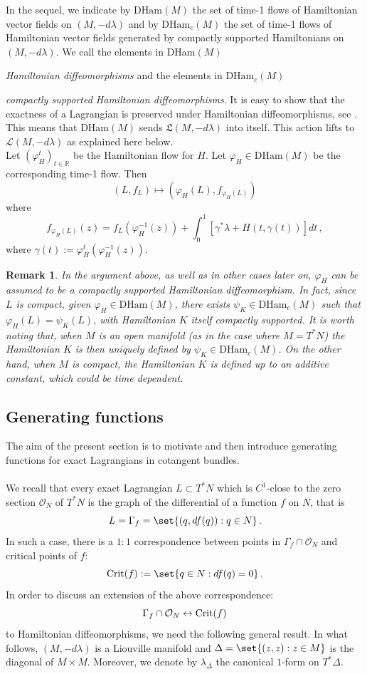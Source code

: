 \documentclass{article}
\newcommand{\1}{\mathbbm{1}}
\newtheorem{rem}[thm]{Remark}
\theoremstyle{remark}
\begin{document}
\noindent In the sequel, we indicate by $\mathrm{DHam}(M)$ the set of time-1 flows of Hamiltonian vector fields on $(M, -d\lambda)$ and by $\mathrm{DHam}_c(M)$ the set of time-1 flows of Hamiltonian vector fields generated by compactly supported Hamiltonians on $(M, -d\lambda)$. We call the elements in $\mathrm{DHam}(M)$ {\textit{Hamiltonian diffeomorphisms} and the elements in $\mathrm{DHam}_c(M)$  {\textit{compactly supported Hamiltonian diffeomorphisms}. 
It is easy to show that the exactness of a Lagrangian is preserved under Hamiltonian diffeomorphisms, see \cite[Corollary 9.3.6]{mcDSal16}. This means that $\mathrm{DHam}(M)$ sends $\mathfrak{L}(M, -d\lambda)$ into itself. This action lifts to $\mathscr{L}(M, -d\lambda)$ as explained here below. \\
Let $(\varphi^t_H)_{t \in \mathbb{R}}$ be the Hamiltonian flow for $H$. Let $\varphi_H \in \mathrm{DHam}(M)$ be the corresponding time-1 flow. Then
$$(L,f_L) \mapsto(\varphi_H(L), f_{\varphi_H(L)})$$
where
$$f_{\varphi_H(L)}(z) = f_L(\varphi_H^{-1}(z)) + \int^1_0[\gamma^*\lambda + H(t,\gamma(t))]dt\, ,$$
where $\gamma(t) := \varphi^t_H(\varphi_H^{-1}(z))$.
\begin{rem} \label{nota supp com} {\textnormal{In the argument above, as well as in other cases later on, $\varphi_H$ can be assumed to be a compactly supported Hamiltonian diffeomorphism. In fact, since $L$ is compact, given $\varphi_H \in \mathrm{DHam}(M)$, there exists $\psi_K \in \mathrm{DHam}_c(M)$ such that $\varphi_H(L) = \psi_K(L)$, with Hamiltonian $K$ itself compactly supported. It is worth noting that, when $M$ is an open manifold (as in the case where $M = T^*N$) the Hamiltonian $K$ is then uniquely defined by $\psi_K \in \mathrm{DHam}_c(M)$. On the other hand, when $M$ is compact, the Hamiltonian $K$ is defined up to an additive constant, which could be time dependent.}}
\end{rem}}


\subsection{Generating functions}
The aim of the present section is to motivate and then introduce generating functions for exact Lagrangians in cotangent bundles. \\ \\
\noindent We recall that every exact Lagrangian $L \subset T^*N$ which is $C^1$-close to the zero section $\mathcal{O}_N$ of $T^*N$ is the graph of the differential of a function $f$ on $N$, that is
$$L = \Gamma_f = \set{ (q,df(q)): q \in N}\, .$$
In such a case, there is a $1:1$ correspondence between points in $\Gamma_f \cap \mathcal{O}_N$ and critical points of $f$:
$$\textnormal{Crit}(f) := \set{q \in N: df(q) = 0 }\, .$$
\noindent In order to discuss an extension of the above correspondence:
$$\Gamma_f \cap \mathcal{O}_N \leftrightarrow \textnormal{Crit}(f)$$ 
to Hamiltonian diffeomorphisms, we need the following general result. In what follows, $(M,-d \lambda)$ is a Liouville manifold and $\Delta = \set{(z,z): z \in M}$ is the diagonal of $M\times M$. Moreover, we denote by $\lambda_\Delta$ the canonical $1$-form on $T^*\Delta$.

}
\end{document}
